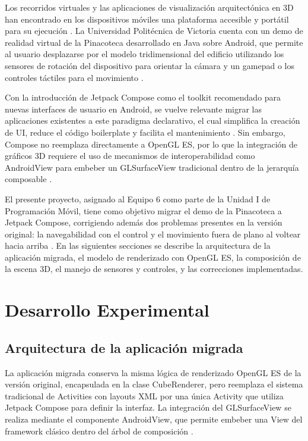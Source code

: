 \documentclass[conference]{IEEEtran}
\begin{document}
Los recorridos virtuales y las aplicaciones de visualización arquitectónica en 3D han encontrado en los dispositivos móviles una plataforma accesible y portátil para su ejecución \cite{wright2010,shreiner2013}. La Universidad Politécnica de Victoria cuenta con un demo de realidad virtual de la Pinacoteca desarrollado en Java sobre Android, que permite al usuario desplazarse por el modelo tridimensional del edificio utilizando los sensores de rotación del dispositivo para orientar la cámara y un gamepad o los controles táctiles para el movimiento \cite{android_sensors}.

Con la introducción de Jetpack Compose como el toolkit recomendado para nuevas interfaces de usuario en Android, se vuelve relevante migrar las aplicaciones existentes a este paradigma declarativo, el cual simplifica la creación de UI, reduce el código boilerplate y facilita el mantenimiento \cite{android_compose}. Sin embargo, Compose no reemplaza directamente a OpenGL ES, por lo que la integración de gráficos 3D requiere el uso de mecanismos de interoperabilidad como AndroidView para embeber un GLSurfaceView tradicional dentro de la jerarquía composable \cite{compose_viewinterop}.

El presente proyecto, asignado al Equipo 6 como parte de la Unidad I de Programación Móvil, tiene como objetivo migrar el demo de la Pinacoteca a Jetpack Compose, corrigiendo además dos problemas presentes en la versión original: la navegabilidad con el control y el movimiento fuera de plano al voltear hacia arriba \cite{android_gamepad}. En las siguientes secciones se describe la arquitectura de la aplicación migrada, el modelo de renderizado con OpenGL ES, la composición de la escena 3D, el manejo de sensores y controles, y las correcciones implementadas.

\section{Desarrollo Experimental}

\subsection{Arquitectura de la aplicación migrada}

La aplicación migrada conserva la misma lógica de renderizado OpenGL ES de la versión original, encapsulada en la clase CubeRenderer, pero reemplaza el sistema tradicional de Activities con layouts XML por una única Activity que utiliza Jetpack Compose para definir la interfaz. La integración del GLSurfaceView se realiza mediante el componente AndroidView, que permite embeber una View del framework clásico dentro del árbol de composición \cite{compose_viewinterop}.
\end{document}
